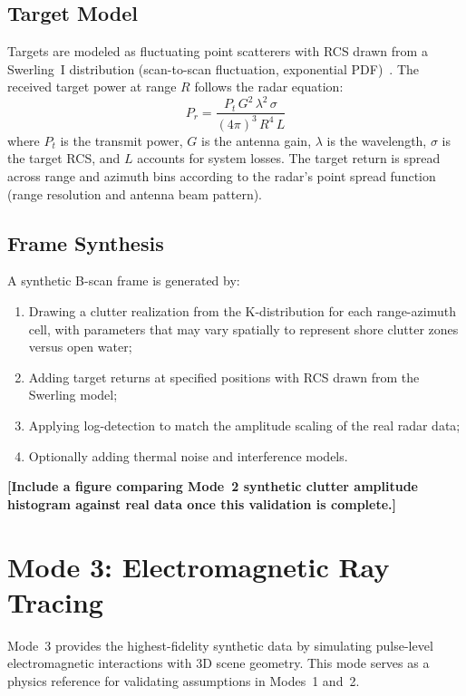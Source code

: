 \documentclass[twocolumn, 10pt]{article}
\newcommand{\ph}[1]{\textbf{[#1]}}
\begin{document}
\subsection{Target Model}

Targets are modeled as fluctuating point scatterers with RCS drawn from a Swerling~I distribution (scan-to-scan fluctuation, exponential PDF)~\cite{swerling1960probability}. The received target power at range $R$ follows the radar equation:
\begin{equation}
P_r = \frac{P_t\, G^2\, \lambda^2\, \sigma}{(4\pi)^3\, R^4\, L}
\label{eq:radarequation}
\end{equation}
where $P_t$ is the transmit power, $G$ is the antenna gain, $\lambda$ is the wavelength, $\sigma$ is the target RCS, and $L$ accounts for system losses. The target return is spread across range and azimuth bins according to the radar's point spread function (range resolution and antenna beam pattern).

\subsection{Frame Synthesis}

A synthetic B-scan frame is generated by:
\begin{enumerate}
    \item Drawing a clutter realization from the K-distribution for each range-azimuth cell, with parameters that may vary spatially to represent shore clutter zones versus open water;
    \item Adding target returns at specified positions with RCS drawn from the Swerling model;
    \item Applying log-detection to match the amplitude scaling of the real radar data;
    \item Optionally adding thermal noise and interference models.
\end{enumerate}

\ph{Include a figure comparing Mode~2 synthetic clutter amplitude histogram against real data once this validation is complete.}

\section{Mode 3: Electromagnetic Ray Tracing}
\label{sec:mode3}

Mode~3 provides the highest-fidelity synthetic data by simulating pulse-level electromagnetic interactions with 3D scene geometry. This mode serves as a physics reference for validating assumptions in Modes~1 and~2.
\end{document}

